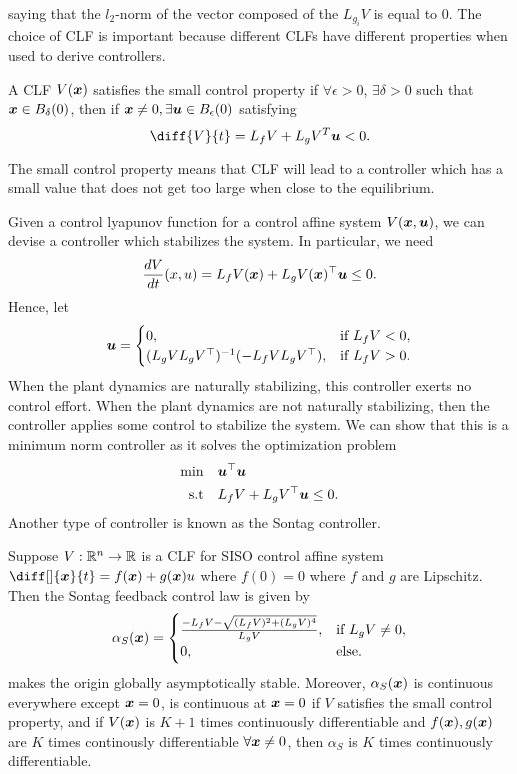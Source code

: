 saying that the $l_2$-norm of the vector composed of the $L_{g_i} V$ is equal to
0. The choice of CLF is important because different CLFs have different
properties when used to derive controllers.
\begin{definition}
	A CLF $V(\boldsymbol{x})$ satisfies the small control property if $\forall \epsilon >
	0$, $\exists \delta > 0$ such that $\boldsymbol{x}\in B_\delta(0)$, then if
	$\boldsymbol{x}\neq0, \exists \boldsymbol{u}\in B_\epsilon(0)$ satisfying \[
		\diff{V}{t} = L_fV + L_gV^T\bs{u} < 0.
	\]
	\label{defn:small-control}
\end{definition}
The small control property means that CLF will lead to a controller which has a
small value that does not get too large when close to the equilibrium.

Given a control lyapunov function for a control affine system $V(\boldsymbol{x},
\boldsymbol{u})$, we can devise
a controller which stabilizes the system. In particular, we need \[
	\frac{dV}{dt}(x, u) = L_f V(\boldsymbol{x}) + L_gV(\boldsymbol{x})^\top \boldsymbol{u} \leq 0.
\]
Hence, let \[
	\boldsymbol{u} = \begin{cases}
		0, & \text{if } L_f V < 0,\\
		(L_gVL_gV^\top)^{-1}(-L_fV L_gV^\top), & \text{if } L_f V > 0.
	\end{cases}
\]
When the plant dynamics are naturally stabilizing, this controller exerts no
control effort. When the plant dynamics are not naturally stabilizing, then the
controller applies some control to stabilize the system. We can show that this
is a minimum norm controller as it solves the optimization problem \[
	\begin{aligned}
		\min &\quad \boldsymbol{u}^\top \boldsymbol{u}\\
		\text{s.t} &\quad L_fV + L_gV^\top \boldsymbol{u} \leq 0.
	\end{aligned}
\]
Another type of controller is known as the Sontag controller.
\begin{theorem}
	Suppose $V:\mathbb{R}^n\to\mathbb{R}$ is a CLF for SISO control affine system $\diff[]{\bs{x}}{t} =
	f(\bs{x}) + g(\bs{x})u$ where $f(0) = 0$ where $f$ and $g$ are Lipschitz. Then
	the Sontag feedback control law is given by \[
		\alpha_S(\boldsymbol{x}) = \begin{cases}
			\frac{-L_fV - \sqrt{(L_fV)^2 + (L_gV)^4}}{L_gV}, & \text{if } L_gV \neq
			0,\\
			0, & \text{else.}
		\end{cases}
	\]
	makes the origin globally asymptotically stable. Moreover,
	$\alpha_S(\boldsymbol{x})$ is continuous everywhere except $\boldsymbol{x} = 0$, is
	continuous at $\boldsymbol{x}=0$ if $V$ satisfies the small control property, and if
	$V(\boldsymbol{x})$ is $K+1$ times continuously differentiable and $f(\boldsymbol{x}),
	g(\boldsymbol{x})$ are $K$ times continously differentiable $\forall \boldsymbol{x}\neq0$,
	then $\alpha_S$ is $K$ times continuously differentiable.
	\label{thm:sontag}
\end{theorem}
